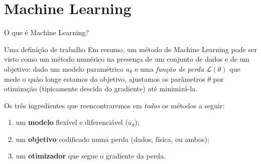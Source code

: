 \section{Machine Learning}

\begin{frame}{O que é Machine Learning?}
  \begin{block}{Uma definição de trabalho}
    Em resumo, um método de Machine Learning pode ser visto como um
    \alert{método numérico na presença de um conjunto de dados} e de um \alert{objetivo}:
    dado um modelo paramétrico $u_\theta$ e uma \emph{função de perda} $\mathcal{L}(\theta)$
    que mede o quão longe estamos do objetivo, ajustamos os parâmetros $\theta$ por
    otimização (tipicamente descida do gradiente) até minimizá-la.
  \end{block}

  \vspace{0.3cm}
  Os três ingredientes que reencontraremos em \emph{todos} os métodos a seguir:
  \begin{enumerate}
    \item um \textbf{modelo} flexível e diferenciável ($u_\theta$);
    \item um \textbf{objetivo} codificado numa perda (dados, física, ou ambos);
    \item um \textbf{otimizador} que segue o gradiente da perda.
  \end{enumerate}
\end{frame}

